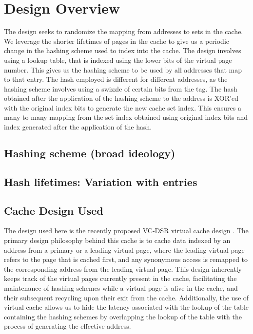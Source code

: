 \section{Design Overview}
The design seeks to randomize the mapping from addresses to sets in the cache. We leverage the shorter lifetimes of pages in the cache to give us a periodic change in the hashing scheme used to index into the cache. The design involves using a lookup table, that is indexed using the lower bits of the virtual page number. This gives us the hashing scheme to be used by all addresses that map to that entry. The hash employed is different for different addresses, as the hashing scheme involves using a swizzle of certain bits from the tag. The hash obtained after the application of the hashing scheme to the address is XOR'ed with the original index bits to generate the new cache set index. This ensures a many to many mapping from the set index obtained using original index bits and index generated after the application of the hash. 
\subsection{Hashing scheme (broad ideology)}
\subsection{Hash lifetimes: Variation with entries}
\subsection{Cache Design Used}
The design used here is the recently proposed VC-DSR virtual cache design \cite{}. The primary design philosophy behind this cache is to cache data indexed by an address from a primary or a leading virtual page, where the leading virtual page refers to the page that is cached first, and any synonymous access is remapped to the corresponding address from the leading virtual page.  This design inherently keeps track of the virtual pages currently present in the cache, facilitating the maintenance of hashing schemes while a virtual page is alive in the cache, and their subsequent recycling upon their exit from the cache. Additionally, the use of virtual cache allows us to hide the latency associated with the lookup of the table containing the hashing schemes by overlapping the lookup of the table with the process of generating the effective address. 

